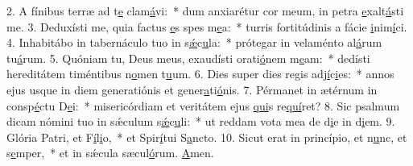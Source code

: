 2. A fínibus terræ ad t\uline{e} clam\uline{á}vi:~* dum anxiarétur cor meum, in petra \uline{e}xalt\uline{á}sti me.
3. Deduxísti me, quia factus \uline{e}s spes m\uline{e}a:~* turris fortitúdinis a fácie \uline{i}nim\uline{í}ci.
4. Inhabitábo in tabernáculo tuo in s\uline{ǽ}c\uline{u}la:~* prótegar in velaménto al\uline{á}rum tu\uline{á}rum.
5. Quóniam tu, Deus meus, exaudísti orati\uline{ó}nem m\uline{e}am:~* dedísti hereditátem timéntibus n\uline{o}men t\uline{u}um.
6. Dies super dies regis adj\uline{í}c\uline{i}es:~* annos ejus usque in diem generatiónis et gener\uline{a}ti\uline{ó}nis.
7. Pérmanet in ætérnum in consp\uline{é}ctu D\uline{e}i:~* misericórdiam et veritátem ejus \uline{qui}s re\uline{quí}ret?
8. Sic psalmum dicam nómini tuo in sǽculum s\uline{ǽ}c\uline{u}li:~* ut reddam vota mea de d\uline{i}e in d\uline{i}em.
9. Glória Patri, et F\uline{í}l\uline{i}o,~* et Spir\uline{í}tui S\uline{a}ncto.
10. Sicut erat in princípio, et n\uline{u}nc, et s\uline{e}mper,~* et in sǽcula sæcul\uline{ó}rum. \uline{A}men.
